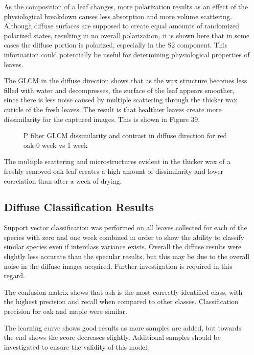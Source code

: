 As the composition of a leaf changes, more polarization results as an effect of the physiological breakdown causes less absorption and more volume scattering.  Although diffuse surfaces are supposed to create equal amounts of randomized polarized states, resulting in no overall polarization, it is shown here that in some cases the diffuse portion is polarized, especially in the S2 component.  This information could potentially be useful for determining physiological properties of leaves.

The GLCM in the diffuse direction shows that as the wax structure becomes less filled with water and decompresses, the surface of the leaf appears smoother, since there is less noise caused by multiple scattering through the thicker wax cuticle of the fresh leaves.  The result is that healthier leaves create more dissimilarity for the captured images.  This is shown in Figure 39.
%
\begin{figure}[!htb]
    \begin{center}
    \end{center}
    \caption{P filter GLCM dissimilarity and contrast in diffuse direction for red oak 0 week vs 1 week}
    \label{fig:polarization}
\end{figure}
%
The multiple scattering and microstructures evident in the thicker wax of a freshly removed oak leaf creates a high amount of dissimilarity and lower correlation than after a week of drying.

\subsection{Diffuse Classification Results}
Support vector classification was performed on all leaves collected for each of the species with zero and one week combined in order to show the ability to classify similar species even if interclass variance exists.  Overall the diffuse results were slightly less accurate than the specular results, but this may be due to the overall noise in the diffuse images acquired.  Further investigation is required in this regard.

The confusion matrix shows that ash is the most correctly identified class, with the highest precision and recall when compared to other classes.  Classification precision for oak and maple were similar.

The learning curve shows good results as more samples are added, but towards the end shows the score decreases slightly.  Additional samples should be investigated to ensure the validity of this model.


